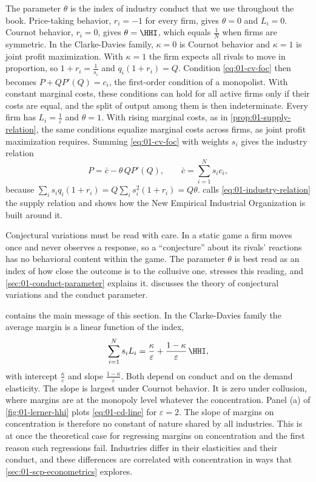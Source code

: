 The parameter $\theta$ is the index of industry conduct that we use throughout the book. Price-taking behavior,
$r_i = -1$ for every firm, gives $\theta = 0$ and $L_i = 0$. Cournot behavior, $r_i = 0$, gives
$\theta = \HHI$, which equals $\frac{1}{N}$ when firms are symmetric. In the Clarke-Davies family, $\kappa = 0$
is Cournot behavior and $\kappa = 1$ is joint profit maximization. With $\kappa = 1$ the firm expects all rivals
to move in proportion, so $1 + r_i = \frac{1}{s_i}$ and $q_i(1 + r_i) = Q$. Condition \eqref{eq:01-cv-foc} then
becomes $P + Q P'(Q) = c_i$, the first-order condition of a monopolist. With constant marginal costs, these
conditions can hold for all active firms only if their costs are equal, and the split of output among them is then
indeterminate. Every firm has $L_i = \frac{1}{\varepsilon}$ and $\theta = 1$. With rising marginal costs, as in
\cref{prop:01-supply-relation}, the same conditions equalize marginal costs across firms, as joint profit
maximization requires. Summing \eqref{eq:01-cv-foc} with weights $s_i$ gives the industry relation
\begin{equation}\label{eq:01-industry-relation}
  P = \bar c - \theta\, Q P'(Q), \qquad \bar c = \sum_{i=1}^{N} s_i c_i ,
\end{equation}
because $\sum_i s_i q_i (1 + r_i) = Q\sum_i s_i^2(1 + r_i) = Q\theta$.  calls
\eqref{eq:01-industry-relation} the supply relation and shows how the New Empirical Industrial Organization is
built around it.

Conjectural variations must be read with care. In a static game a firm moves once and never observes a response,
so a ``conjecture'' about its rivals' reactions has no behavioral content within the game. The parameter
$\theta$ is best read as an index of how close the outcome is to the collusive one. \citet{Bresnahan1989}
stresses this reading, and \cref{sec:01-conduct-parameter} explains it.  discusses the theory of
conjectural variations and the conduct parameter.

 contains the main message of this section. In the Clarke-Davies family the average
margin is a linear function of the index,
\begin{equation}\label{eq:01-cd-line}
  \sum_{i=1}^{N} s_i L_i = \frac{\kappa}{\varepsilon} + \frac{1 - \kappa}{\varepsilon}\,\HHI ,
\end{equation}
with intercept $\frac{\kappa}{\varepsilon}$ and slope $\frac{1 - \kappa}{\varepsilon}$. Both depend on conduct and
on the demand elasticity. The slope is largest under Cournot behavior. It is zero under collusion, where margins
are at the monopoly level whatever the concentration. Panel (a) of \cref{fig:01-lerner-hhi} plots
\eqref{eq:01-cd-line} for $\varepsilon = 2$. The slope of margins on concentration is therefore no constant of
nature shared by all industries. This is at once the theoretical case for regressing margins on concentration
and the first reason such regressions fail. Industries differ in their elasticities and their conduct, and these
differences are correlated with concentration in ways that \cref{sec:01-scp-econometrics} explores.

